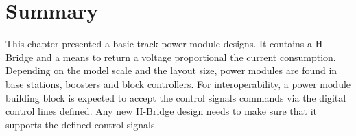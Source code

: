 \section{Summary}

This chapter presented a basic track power module designs. It contains a H-Bridge and a means to return a voltage proportional the current consumption. Depending on the model scale and the layout size, power modules are found in base stations, boosters and block controllers. For interoperability, a power module building block is expected to accept the control signals commands via the digital control lines defined. Any new H-Bridge design needs to make sure that it supports the defined control signals.
